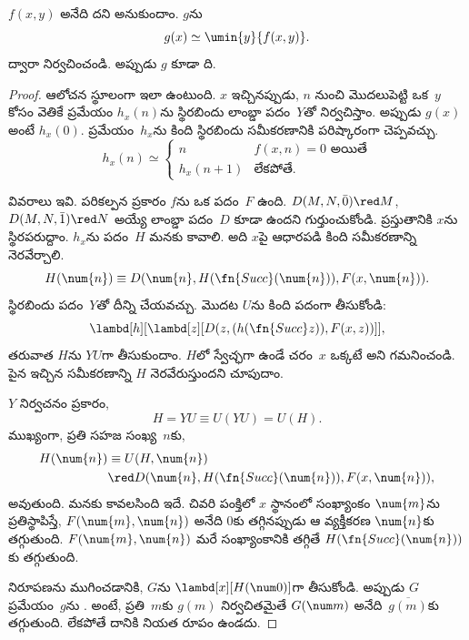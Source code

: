 \documentclass[../../../include/open-logic-section]{subfiles}
\begin{document}

\begin{lem}
$f(x,y)$ అనేది దని అనుకుందాం. $g$ను
\[
g(x) \simeq \umin{y}{f(x,y)}.
\]
ద్వారా నిర్వచించండి. అప్పుడు $g$ కూడా ది.
\end{lem}

\begin{proof}
ఆలోచన స్థూలంగా ఇలా ఉంటుంది. $x$ ఇచ్చినప్పుడు, $n$ నుంచి మొదలుపెట్టి
ఒక~$y$ కోసం వెతికే ప్రమేయం $h_x(n)$ను స్థిరబిందు లాంబ్డా పదం~$Y$తో
నిర్వచిస్తాం. అప్పుడు $g(x)$ అంటే $h_x(0)$. ప్రమేయం~$h_x$ను
కింది స్థిరబిందు సమీకరణానికి పరిష్కారంగా చెప్పవచ్చు.
\[
h_x(n) \simeq
\begin{cases}
n & \text{$f(x,n) = 0$ అయితే} \\
h_x(n+1) & \text{లేకపోతే.}
\end{cases}
\]

వివరాలు ఇవి. పరికల్పన ప్రకారం $f$ను  ఒక పదం~$F$ ఉంది.
$D(M, N, \bar{0}) \red M$, $D(M, N, \bar{1}) \red N$ అయ్యే లాంబ్డా
పదం~$D$ కూడా ఉందని గుర్తుంచుకోండి. ప్రస్తుతానికి $x$ను స్థిరపరుద్దాం.
$h_x$ను  పదం~$H$ మనకు కావాలి. అది $x$పై ఆధారపడి
కింది సమీకరణాన్ని నెరవేర్చాలి.
\[
H(\num{n}) \equiv D(\num{n}, H(\fn{Succ}(\num{n})), F(x, \num{n})).
\]
స్థిరబిందు పదం~$Y$తో దీన్ని చేయవచ్చు. మొదట $U$ను కింది పదంగా
తీసుకోండి:
\[
\lambd[h][\lambd[z][D(z,(h(\fn{Succ}z)),F(x,z))]],
\]
తరువాత $H$ను $YU$గా తీసుకుందాం. $H$లో స్వేచ్ఛగా ఉండే చరం~$x$
ఒక్కటే అని గమనించండి. పైన ఇచ్చిన సమీకరణాన్ని $H$ నెరవేరుస్తుందని చూపుదాం.

$Y$ నిర్వచనం ప్రకారం,
\[
H = YU \equiv U(YU) = U(H).
\]
ముఖ్యంగా, ప్రతి సహజ సంఖ్య~$n$కు,
\begin{align*}
H(\num{n}) & \equiv U(H, \num{n}) \\
& \red D(\num{n}, H(\fn{Succ}(\num{n})), F(x, \num{n})),
\end{align*}
అవుతుంది. మనకు కావలసింది ఇదే. చివరి పంక్తిలో $x$ స్థానంలో సంఖ్యాంకం
$\num{m}$ను ప్రతిస్థాపిస్తే, $F(\num{m}, \num{n})$ అనేది $\num{0}$కు
తగ్గినప్పుడు ఆ వ్యక్తీకరణ $\num{n}$కు తగ్గుతుంది. $F(\num{m},
\num{n})$ మరే సంఖ్యాంకానికి తగ్గితే $H(\fn{Succ}(\num{n}))$కు తగ్గుతుంది.

నిరూపణను ముగించడానికి, $G$ను $\lambd[x][H(\num 0)]$గా తీసుకోండి.
అప్పుడు $G$ ప్రమేయం~$g$ను .
అంటే, ప్రతి~$m$కు $g(m)$ నిర్వచితమైతే $G(\num m)$ అనేది~$\overline {g(m)}$కు
తగ్గుతుంది. లేకపోతే దానికి నియత రూపం ఉండదు.
%
\end{proof}
\end{document}
